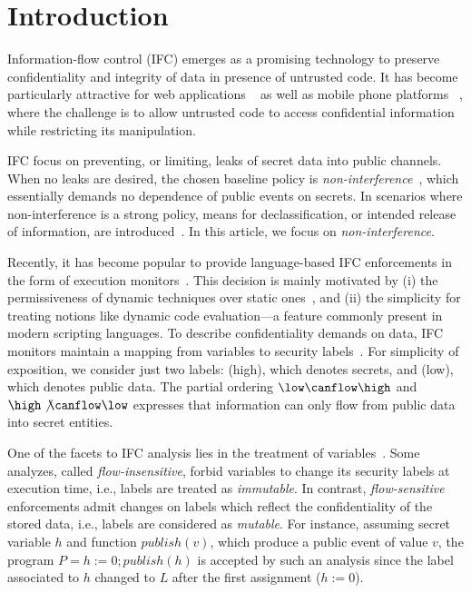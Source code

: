 \section{Introduction}
\label{sec:intro}

Information-flow control (IFC) emerges as a promising technology to preserve
confidentiality and integrity of data in presence of untrusted code.  It has
become particularly attractive for web applications
~\citep[e.g.][]{DeGroef:2012:FWB:2382196.2382275, giffin:hails,
  yang:2013:towards, conf/esorics/AkhaweLHSS13, Hedin13} as well as mobile phone
platforms ~\citep[e.g.][]{Enck:2010,android:esorics13}, where the challenge is
to allow untrusted code to access confidential information while restricting its
manipulation.

IFC focus on preventing, or limiting, leaks of secret data into public
channels. When no leaks are desired, the chosen baseline policy is
\emph{non-interference}~\citep{Goguen:Meseguer:Noninterference}, which 
essentially demands no dependence of public events on secrets. In scenarios where
non-interference is a strong policy, means for declassification, or intended
release of information, are introduced~\citep{Sabelfeld:Sands:CSFW05}. In this
article, we focus on \emph{non-interference}. 

Recently, it has become popular to provide language-based IFC enforcements in
the form of execution monitors~\citep{Hedin2011}. This decision is mainly
motivated by (i) the permissiveness of dynamic techniques over static
ones~\citep{Sabelfeld:Russo:PSI09}, and (ii) the simplicity for treating notions
like dynamic code evaluation---a feature commonly present in modern scripting
languages. To describe confidentiality demands on data, IFC monitors maintain a
mapping from variables to security labels~\citep{myers:dlm,Stefan:2011}.  For
simplicity of exposition, we consider just two labels: \high (high), which
denotes secrets, and \low (low), which denotes public data. The partial ordering
$\low \canflow \high$ and $\high \not \canflow \low$ expresses that information
can only flow from public data into secret entities.

One of the facets to IFC analysis lies in the treatment of
variables~\citep{Hunt:2006}. Some analyzes, called \emph{flow-insensitive},
forbid variables to change its security labels at execution time, i.e., labels
are treated as \emph{immutable}. In contrast, \emph{flow-sensitive} enforcements
admit changes on labels which reflect the confidentiality of the stored
data, i.e., labels are considered as \emph{mutable}. For instance, assuming secret
variable $h$ and function $\mathit{publish}(v)$, which produce a public event of
value $v$, the program $P = h := 0 ; \mathit{publish}(h)$ is accepted by such an
analysis since the label associated to $h$ changed to $L$ after the first
assignment ($h := 0$).

